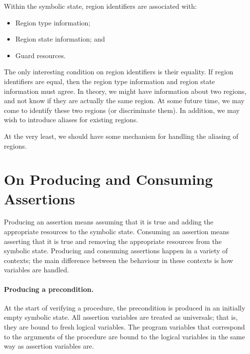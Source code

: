 \documentclass[a4paper]{article}
\begin{document}
Within the symbolic state, region identifiers are associated with:
\begin{itemize}
  \item Region type information;
  \item Region state information; and
  \item Guard resources.
\end{itemize}

The only interesting condition on region identifiers is their equality.
If region identifiers are equal, then the region type information and region state information must agree.
In theory, we might have information about two regions, and not know if they are actually the same region.
At some future time, we may come to identify these two regions (or discriminate them).
In addition, we may wish to introduce aliases for existing regions.

At the very least, we should have some mechanism for handling the aliasing of regions.

\section{On Producing and Consuming Assertions}

Producing an assertion means assuming that it is true and adding the appropriate resources to the symbolic state.
Consuming an assertion means asserting that it is true and removing the appropriate resources from the symbolic state.
Producing and consuming assertions happen in a variety of contexts; the main difference between the behaviour in these contexts is how variables are handled.

\paragraph{Producing a precondition.}
At the start of verifying a procedure, the precondition is produced in an initially empty symbolic state.
All assertion variables are treated as universals; that is, they are bound to fresh logical variables.
The program variables that correspond to the arguments of the procedure are bound to the logical variables in the same way as assertion variables are.
\end{document}
